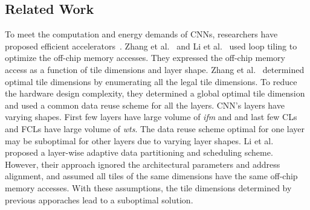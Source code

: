 \documentclass[a4paper,10pt]{article}
\begin{document}
\subsection{Related Work}
To meet the computation and energy demands of CNNs, researchers have proposed efficient accelerators~\cite{gokhale2014240,8742284,alwani2016fused, Chen2016EyerissAS}. Zhang et al.~\cite{zhang2015optimizing} and Li et al.~\cite{Li2018SmartShuttleOO} used loop tiling to optimize the off-chip memory accesses. They expressed the off-chip memory access as a function of tile dimensions and layer shape. Zhang et al.~\cite{zhang2015optimizing} determined optimal tile dimensions by enumerating all the legal tile dimensions. To reduce the hardware design complexity, they determined a global optimal tile dimension and used a common data reuse scheme for all the layers. 
CNN's layers have varying shapes. First few layers have large volume of \textit{ifm} and  and last few CLs and FCLs have large volume of \textit{wts}. The data reuse scheme optimal for one layer may be suboptimal for other layers due to varying layer shapes. Li et al.~\cite{Li2018SmartShuttleOO} proposed a layer-wise adaptive data partitioning and scheduling scheme. However, their approach ignored the architectural parameters and address alignment, and assumed all tiles of the same dimensions have the same off-chip memory accesses. With these assumptions, the tile dimensions determined by previous apporaches lead to a suboptimal solution.
\end{document}
